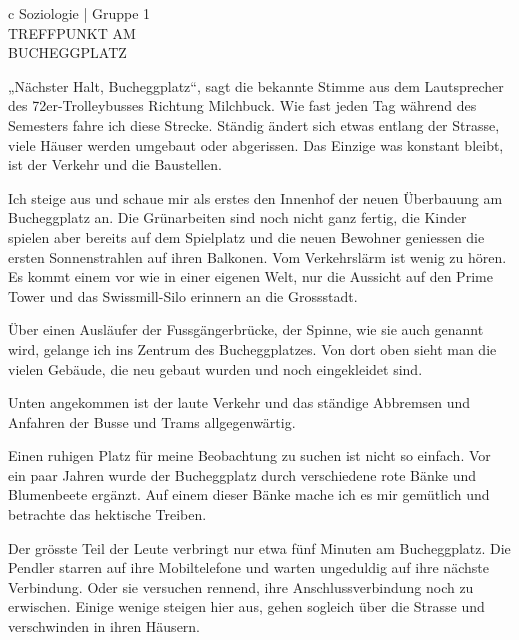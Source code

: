 \documentclass[a4paper,ngerman,11pt]{scrartcl}
\begin{document}
\begin{center}
  \begin{tabular}{{c}}
    \toprule
    \large{Soziologie | Gruppe 1}\\
    \Huge{\uppercase{Treffpunkt am}}\\
    \Huge{\uppercase{Bucheggplatz}}\\
    \bottomrule
\end{tabular}
\end{center}

\vspace*{2cm}

\noindent{}
„Nächster Halt, Bucheggplatz“, sagt die bekannte Stimme aus dem Lautsprecher des
72er-Trolleybusses Richtung Milchbuck. Wie fast jeden Tag während des Semesters
fahre ich diese Strecke. Ständig ändert sich etwas entlang der Strasse, viele
Häuser werden umgebaut oder abgerissen. Das Einzige was konstant bleibt, ist der
Verkehr und die Baustellen.

Ich steige aus und schaue mir als erstes den Innenhof der neuen Überbauung am
Bucheggplatz an. Die Grünarbeiten sind noch nicht ganz fertig, die Kinder
spielen aber bereits auf dem Spielplatz und die neuen Bewohner geniessen die
ersten Sonnenstrahlen auf ihren Balkonen. Vom Verkehrslärm ist wenig zu
hören. Es kommt einem vor wie in einer eigenen Welt, nur die Aussicht auf den
Prime Tower und das Swissmill-Silo erinnern an die Grossstadt.

Über einen Ausläufer der Fussgängerbrücke, der Spinne, wie sie auch genannt
wird, gelange ich ins Zentrum des Bucheggplatzes. Von dort oben sieht man die
vielen Gebäude, die neu gebaut wurden und noch eingekleidet sind.

Unten angekommen ist der laute Verkehr und das ständige Abbremsen und Anfahren
der Busse und Trams allgegenwärtig.

Einen ruhigen Platz für meine Beobachtung zu suchen ist nicht so einfach. Vor
ein paar Jahren wurde der Bucheggplatz durch verschiedene rote Bänke und
Blumenbeete ergänzt. Auf einem dieser Bänke mache ich es mir gemütlich und
betrachte das hektische Treiben.

Der grösste Teil der Leute verbringt nur etwa fünf Minuten am Bucheggplatz. Die
Pendler starren auf ihre Mobiltelefone und warten ungeduldig auf ihre nächste
Verbindung. Oder sie versuchen rennend, ihre Anschlussverbindung noch zu
erwischen. Einige wenige steigen hier aus, gehen sogleich über die Strasse und
verschwinden in ihren Häusern.
\end{document}
